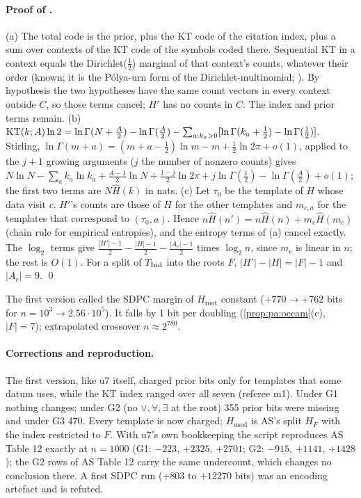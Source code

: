 \paragraph{Proof of .} (a) The total code is the prior, plus the KT code of the citation index, plus a sum over contexts of the KT code of the symbols coded there. Sequential KT in a context equals the Dirichlet($\frac12$) marginal of that context's counts, whatever their order (known; it is the P\'olya-urn form of the Dirichlet-multinomial; \citealp{krichevsky1981performance}). By hypothesis the two hypotheses have the same count vectors in every context outside $C$, so those terms cancel; $H'$ has no counts in $C$. The index and prior terms remain.
(b) $\mathrm{KT}(k;A)\ln2=\ln\Gamma(N+\frac A2)-\ln\Gamma(\frac A2)-\sum_{a:k_a>0}[\ln\Gamma(k_a+\frac12)-\ln\Gamma(\frac12)]$. Stirling, $\ln\Gamma(m+a)=(m+a-\frac12)\ln m-m+\frac12\ln2\pi+o(1)$, applied to the $j+1$ growing arguments ($j$ the number of nonzero counts) gives $N\ln N-\sum_ak_a\ln k_a+\frac{A-1}2\ln N+\frac{1-j}2\ln2\pi+j\ln\Gamma(\frac12)-\ln\Gamma(\frac A2)+o(1)$; the first two terms are $N\hat H(k)$ in nats.
(c) Let $\tau_0$ be the template of $H$ whose data visit $c$. $H'$'s counts are those of $H$ for the other templates and $m_{c,a}$ for the templates that correspond to $(\tau_0,a)$. Hence $n\hat H(n')=n\hat H(n)+m_c\hat H(m_c)$ (chain rule for empirical entropies), and the entropy terms of (a) cancel exactly. The $\log_2$ terms give $\frac{|H'|-1}2-\frac{|H|-1}2-\frac{|A_c|-1}2$ times $\log_2n$, since $m_c$ is linear in $n$; the rest is $O(1)$. For a split of $T_{\mathrm{Ind}}$ into the roots $F$, $|H'|-|H|=|F|-1$ and $|A_c|=9$. \qed

\begin{remark}\pabrk{}\label{rem:pa:sdpcrefuted}
The first version called the SDPC margin of $H_{\mathrm{root}}$ constant ($+770\to+762$ bits for $n=10^3\to2.56\cdot10^5$). It falls by 1 bit per doubling (\cref{prop:pa:occam}(c), $|F|=7$); extrapolated crossover $n\approx2^{780}$.
\end{remark}

\paragraph{Corrections and reproduction.} The first version, like u7 itself, charged prior bits only for templates that some datum uses, while the KT index ranged over all seven (referee m1). Under G1 nothing changes; under G2 (no $\vee,\forall,\exists$ at the root) 355 prior bits were missing and under G3 470. Every template is now charged; $H_{\mathrm{used}}$ is AS's split $H_F$ with the index restricted to $F$. With u7's own bookkeeping the script reproduces AS Table 12 exactly at $n=1000$ (G1: $-223$, $+2325$, $+2701$; G2: $-915$, $+1141$, $+1428$); the G2 rows of AS Table 12 carry the same undercount, which changes no conclusion there. A first SDPC run ($+803$ to $+12270$ bits) was an encoding artefact and is refuted.

